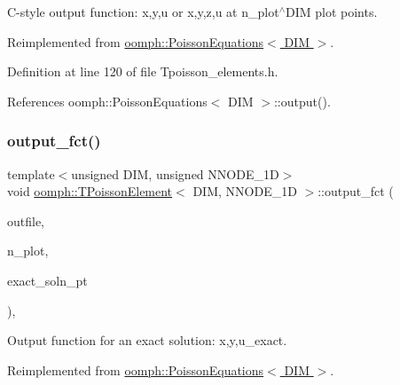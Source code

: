 C-\/style output function\+: x,y,u or x,y,z,u at n\+\_\+plot$^\wedge$\+D\+IM plot points. 



Reimplemented from \hyperlink{classoomph_1_1PoissonEquations_abc30eee5faaa50a65b272012d17ba604}{oomph\+::\+Poisson\+Equations$<$ D\+I\+M $>$}.



Definition at line 120 of file Tpoisson\+\_\+elements.\+h.



References oomph\+::\+Poisson\+Equations$<$ D\+I\+M $>$\+::output().

\mbox{\label{classoomph_1_1TPoissonElement_a69344016c42eb40d39a0061175a6db94}} 
\subsubsection{\texorpdfstring{output\+\_\+fct()}{output\_fct()}\hspace{0.1cm}{\footnotesize\ttfamily [1/2]}}
{\footnotesize\ttfamily template$<$unsigned D\+IM, unsigned N\+N\+O\+D\+E\+\_\+1D$>$ \\
void \hyperlink{classoomph_1_1TPoissonElement}{oomph\+::\+T\+Poisson\+Element}$<$ D\+IM, N\+N\+O\+D\+E\+\_\+1D $>$\+::output\+\_\+fct (\begin{DoxyParamCaption}\item[{std\+::ostream \&}]{outfile,  }\item[{const unsigned \&}]{n\+\_\+plot,  }\item[{\hyperlink{classoomph_1_1FiniteElement_a690fd33af26cc3e84f39bba6d5a85202}{Finite\+Element\+::\+Steady\+Exact\+Solution\+Fct\+Pt}}]{exact\+\_\+soln\+\_\+pt }\end{DoxyParamCaption})\hspace{0.3cm}{\ttfamily [inline]}, {\ttfamily [virtual]}}



Output function for an exact solution\+: x,y,u\+\_\+exact. 



Reimplemented from \hyperlink{classoomph_1_1PoissonEquations_ad6c637c8a5221313c2220e8e8c27ec42}{oomph\+::\+Poisson\+Equations$<$ D\+I\+M $>$}.



